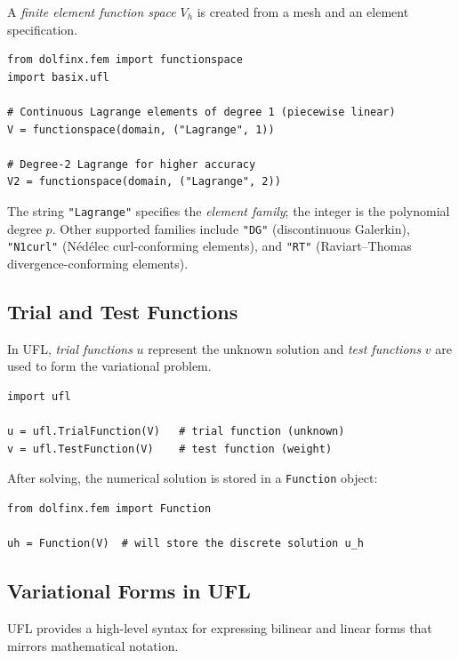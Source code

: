 \documentclass[11pt]{article}
\begin{document}
A \emph{finite element function space} $V_h$ is created from a mesh and an
element specification.

\begin{lstlisting}[style=python, caption={Creating a Lagrange function space.}]
from dolfinx.fem import functionspace
import basix.ufl

# Continuous Lagrange elements of degree 1 (piecewise linear)
V = functionspace(domain, ("Lagrange", 1))

# Degree-2 Lagrange for higher accuracy
V2 = functionspace(domain, ("Lagrange", 2))
\end{lstlisting}

The string \texttt{"Lagrange"} specifies the \emph{element family};
the integer is the polynomial degree $p$.
Other supported families include \texttt{"DG"} (discontinuous Galerkin),
\texttt{"N1curl"} (N\'{e}d\'{e}lec curl-conforming elements),
and \texttt{"RT"} (Raviart--Thomas divergence-conforming elements).

\subsection{Trial and Test Functions}

In UFL, \emph{trial functions} $u$ represent the unknown solution and
\emph{test functions} $v$ are used to form the variational problem.

\begin{lstlisting}[style=python, caption={Defining trial and test functions.}]
import ufl

u = ufl.TrialFunction(V)   # trial function (unknown)
v = ufl.TestFunction(V)    # test function (weight)
\end{lstlisting}

After solving, the numerical solution is stored in a \texttt{Function} object:
\begin{lstlisting}[style=python, caption={Creating a Function to hold the solution.}]
from dolfinx.fem import Function

uh = Function(V)  # will store the discrete solution u_h
\end{lstlisting}

\subsection{Variational Forms in UFL}

UFL provides a high-level syntax for expressing bilinear and linear forms
that mirrors mathematical notation.
\end{document}
